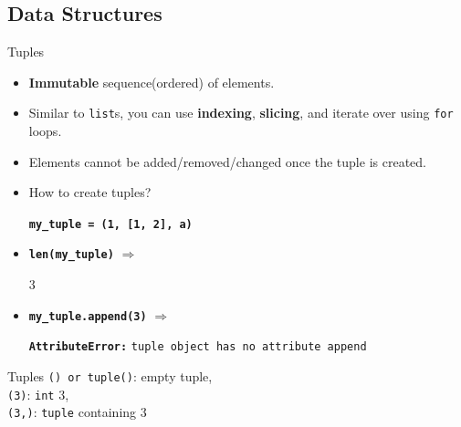     \subsection{Data Structures}
    \begin{frame}{Tuples}
        \LARGE
        \begin{itemize}
            \item \textbf{Immutable} sequence(ordered) of elements.
           
            \item Similar to \texttt{list}s, you can use \textbf{indexing}, \textbf{slicing}, and iterate over using \texttt{for} loops.
            
            \item Elements cannot be added/removed/changed once the tuple is created.
            
            \item How to create tuples?
            
             \textbf{\texttt{my\_tuple = (1, [1, 2], \textquotesingle a\textquotesingle )}}
            
            \item \textbf{\texttt{len(my\_tuple)}} $\Rightarrow$
           
             3
            \item \textbf{\texttt{my\_tuple.append(3)}} $\Rightarrow$
           
             \textbf{\texttt{AttributeError:}} \texttt{\textquotesingle tuple\textquotesingle \ object has no attribute \textquotesingle append\textquotesingle}
        \end{itemize}
    \end{frame}

    \begin{frame}{Tuples}
        \Large
        \texttt{() or tuple()}: empty tuple, \\
        \texttt{(3)}:
        \texttt{int} 3,\\
        \texttt{(3,)}:
        \texttt{tuple} containing 3\\
        \inputminted[frame=single,framesep=2pt]{python3}{../Lecture6/code-examples/tuples.py}
    \end{frame}

